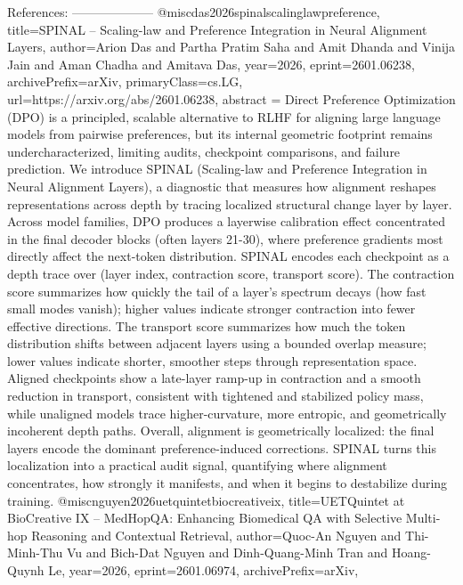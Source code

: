         References:
        --------------------
        @misc{das2026spinalscalinglawpreference,
      title={SPINAL -- Scaling-law and Preference Integration in Neural Alignment Layers}, 
      author={Arion Das and Partha Pratim Saha and Amit Dhanda and Vinija Jain and Aman Chadha and Amitava Das},
      year={2026},
      eprint={2601.06238},
      archivePrefix={arXiv},
      primaryClass={cs.LG},
      url={https://arxiv.org/abs/2601.06238},
      abstract = {Direct Preference Optimization (DPO) is a principled, scalable alternative to RLHF for aligning large language models from pairwise preferences, but its internal geometric footprint remains undercharacterized, limiting audits, checkpoint comparisons, and failure prediction. We introduce SPINAL (Scaling-law and Preference Integration in Neural Alignment Layers), a diagnostic that measures how alignment reshapes representations across depth by tracing localized structural change layer by layer. Across model families, DPO produces a layerwise calibration effect concentrated in the final decoder blocks (often layers 21-30), where preference gradients most directly affect the next-token distribution. SPINAL encodes each checkpoint as a depth trace over (layer index, contraction score, transport score). The contraction score summarizes how quickly the tail of a layer's spectrum decays (how fast small modes vanish); higher values indicate stronger contraction into fewer effective directions. The transport score summarizes how much the token distribution shifts between adjacent layers using a bounded overlap measure; lower values indicate shorter, smoother steps through representation space. Aligned checkpoints show a late-layer ramp-up in contraction and a smooth reduction in transport, consistent with tightened and stabilized policy mass, while unaligned models trace higher-curvature, more entropic, and geometrically incoherent depth paths. Overall, alignment is geometrically localized: the final layers encode the dominant preference-induced corrections. SPINAL turns this localization into a practical audit signal, quantifying where alignment concentrates, how strongly it manifests, and when it begins to destabilize during training.}
}@misc{nguyen2026uetquintetbiocreativeix,
      title={UETQuintet at BioCreative IX -- MedHopQA: Enhancing Biomedical QA with Selective Multi-hop Reasoning and Contextual Retrieval}, 
      author={Quoc-An Nguyen and Thi-Minh-Thu Vu and Bich-Dat Nguyen and Dinh-Quang-Minh Tran and Hoang-Quynh Le},
      year={2026},
      eprint={2601.06974},
      archivePrefix={arXiv},
}
